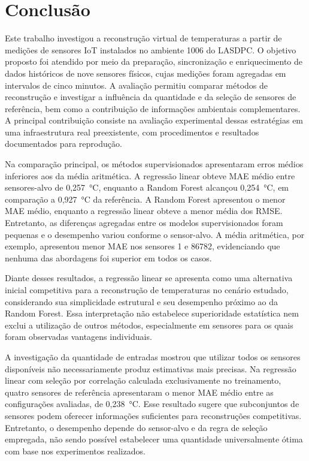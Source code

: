 \chapter{Conclusão}
\label{sec:conclusao}

Este trabalho investigou a reconstrução virtual de temperaturas
a partir de medições de sensores IoT instalados no ambiente 1006
do LASDPC. O objetivo proposto foi atendido por meio da preparação,
sincronização e enriquecimento de dados históricos de nove sensores
físicos, cujas medições foram agregadas em intervalos de cinco
minutos. A avaliação permitiu comparar métodos de reconstrução
e investigar a influência da quantidade e da seleção de sensores
de referência, bem como a contribuição de informações ambientais
complementares. A principal contribuição consiste na avaliação
experimental dessas estratégias em uma infraestrutura real
preexistente, com procedimentos e resultados documentados
para reprodução.

Na comparação principal, os métodos supervisionados apresentaram
erros médios inferiores aos da média aritmética. A regressão
linear obteve MAE médio entre sensores-alvo de 0,257~°C,
enquanto a Random Forest alcançou 0,254~°C, em comparação
a 0,927~°C da referência. A Random Forest apresentou o menor
MAE médio, enquanto a regressão linear obteve a menor média
dos RMSE. Entretanto, as diferenças agregadas entre os modelos
supervisionados foram pequenas e o desempenho variou conforme
o sensor-alvo. A média aritmética, por exemplo, apresentou
menor MAE nos sensores 1 e 86782, evidenciando que nenhuma
das abordagens foi superior em todos os casos.

Diante desses resultados, a regressão linear se apresenta
como uma alternativa inicial competitiva para a reconstrução
de temperaturas no cenário estudado, considerando sua
simplicidade estrutural e seu desempenho próximo ao da
Random Forest. Essa interpretação não estabelece superioridade
estatística nem exclui a utilização de outros métodos,
especialmente em sensores para os quais foram observadas
vantagens individuais.

A investigação da quantidade de entradas mostrou que
utilizar todos os sensores disponíveis não necessariamente
produz estimativas mais precisas. Na regressão linear com
seleção por correlação calculada exclusivamente no treinamento,
quatro sensores de referência apresentaram o menor MAE médio
entre as configurações avaliadas, de 0,238~°C. Esse resultado
sugere que subconjuntos de sensores podem oferecer informações
suficientes para reconstruções competitivas. Entretanto,
o desempenho depende do sensor-alvo e da regra de seleção
empregada, não sendo possível estabelecer uma quantidade
universalmente ótima com base nos experimentos realizados.

